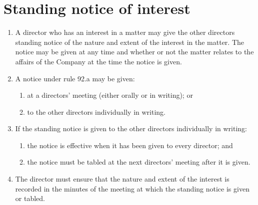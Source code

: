 \section{Standing notice of interest}

\begin{enumerate}[label=(\alph*)]
    \item A director who has an interest in a matter may give the other directors standing notice of the nature and extent of the interest in the matter. The notice may be given at any time and whether or not the matter relates to the affairs of the Company at the time the notice is given.
    
    \item A notice under rule 92.a may be given:
    \begin{enumerate}[label=(\roman*)]
        \item at a directors' meeting (either orally or in writing); or
        \item to the other directors individually in writing.
    \end{enumerate}
    
    \item If the standing notice is given to the other directors individually in writing:
    \begin{enumerate}[label=(\roman*)]
        \item the notice is effective when it has been given to every director; and
        \item the notice must be tabled at the next directors' meeting after it is given.
    \end{enumerate}
    
    \item The director must ensure that the nature and extent of the interest is recorded in the minutes of the meeting at which the standing notice is given or tabled.
\end{enumerate} 
